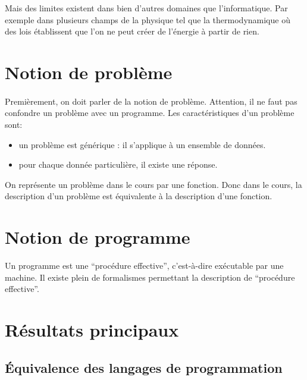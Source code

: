 Mais des limites existent dans bien d'autres domaines que l'informatique. 
Par exemple dans plusieurs champs de la physique tel que la 
thermodynamique où des lois établissent que l'on ne peut créer de l'énergie à partir de rien.

\section{Notion de problème}
\label{sec:notion_de_probl_me}

\paragraph{}
Premièrement, on doit parler de la notion de problème.
Attention, il ne faut pas confondre un problème avec un programme.
Les caractéristiques d'un problème sont:

\begin{itemize}
	\item un problème est générique : il s'applique à un ensemble de données.
	\item pour chaque donnée particulière, il existe une réponse.
\end{itemize}
On représente un problème dans le cours par une fonction. Donc dans le cours,
la description d'un problème est équivalente à la description d'une fonction.

\section{Notion de programme}
\label{sec:notion_de_programme}

Un programme est une ``procédure effective'', c'est-à-dire exécutable par une machine.
Il existe plein de formalismes permettant la description de ``procédure effective''.


\section{Résultats principaux}
\label{sec:r_sultat_principaux}

\subsection{ Équivalence des langages de programmation}
\label{subsec:equivalence_des_langages_de_programmation}

